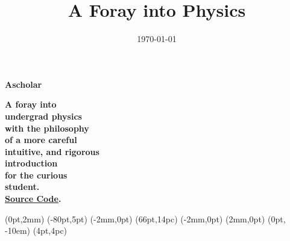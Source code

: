 \documentclass[twoside, 11pt, a4paper]{memoir}
\date{\today}
\title{A Foray into Physics}
\begin{document}
\pagestyle{empty}
\setsansfont{Emberly}
  \NewCoffin \result
  \NewCoffin \aaa
  \NewCoffin \bbb
  \NewCoffin \ccc
  \NewCoffin \ddd
  \NewCoffin \eee
  \NewCoffin \fff
  \NewCoffin {}
  \NewCoffin {}
  \NewCoffin {}

\SetHorizontalCoffin \result {}
\SetHorizontalCoffin {}
\SetHorizontalCoffin {}
\SetHorizontalCoffin {}
\SetHorizontalCoffin {}
\SetVerticalCoffin \eee {180pt}
                 {\raggedleft\fontsize{31}{36}\sffamily\bfseries
                 Ascholar}
\SetVerticalCoffin \fff {140pt}
                 {\raggedright \fontsize{13}{14}\sffamily\bfseries
                       A foray into \\
                       undergrad physics \\
                       with the philosophy \\
                        of a more careful\\
                       intuitive, and rigorous \\
                       introduction\\
                       for the curious \\
                       student. \\
                       \href{https://github.com/Anonscholar}{Source Code}.\\}

\RotateCoffin {}
\RotateCoffin {}

\SetHorizontalCoffin {}
\SetHorizontalCoffin {}
\SetHorizontalCoffin {}


\JoinCoffins \result                \aaa
\JoinCoffins {} (0pt,2mm)
\JoinCoffins {} \bbb     [B,r](-80pt,5pt)
\JoinCoffins {} (-2mm,0pt)
\JoinCoffins {} \ccc     [B,l](66pt,14pc)
\JoinCoffins {} \fff     [t,r](-2mm,0pt)
\JoinCoffins {} (2mm,0pt)
\JoinCoffins {} \eee     [B,r] (0pt, -10em)
\JoinCoffins {} \ddd     [B,r](4pt,4pc)
\end{document}
